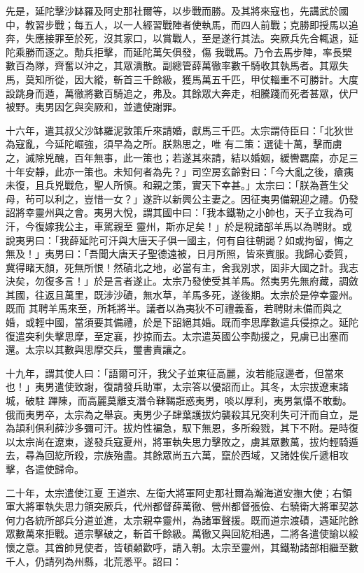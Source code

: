 \begin{pinyinscope}
 先是，延陀擊沙缽羅及阿史那社爾等，以步戰而勝。及其將來寇也，先講武於國中，教習步戰；每五人，以一人經習戰陣者使執馬，而四人前戰；克勝即授馬以追奔，失應接罪至於死，沒其家口，以賞戰人，至是遂行其法。突厥兵先合輒退，延陀乘勝而逐之。勣兵拒擊，而延陀萬矢俱發，傷
 我戰馬。乃令去馬步陣，率長槊數百為隊，齊奮以沖之，其眾潰散。副總管薛萬徹率數千騎收其執馬者。其眾失馬，莫知所從，因大縱，斬首三千餘級，獲馬萬五千匹，甲仗輜重不可勝計。大度設跳身而遁，萬徹將數百騎追之，弗及。其餘眾大奔走，相騰踐而死者甚眾，伏尸被野。夷男因乞與突厥和，並遣使謝罪。



 十六年，遣其叔父沙缽羅泥敦策斤來請婚，獻馬三千匹。太宗謂侍臣曰：「北狄世為寇亂，今延陀崛強，須早為之所。朕熟思之，唯
 有二策：選徒十萬，擊而虜之，滅除兇醜，百年無事，此一策也；若遂其來請，結以婚姻，緩轡羈縻，亦足三十年安靜，此亦一策也。未知何者為先？」司空房玄齡對曰：「今大亂之後，瘡痍未復，且兵兇戰危，聖人所慎。和親之策，實天下幸甚。」太宗曰：「朕為蒼生父母，茍可以利之，豈惜一女？」遂許以新興公主妻之。因征夷男備親迎之禮。仍發詔將幸靈州與之會。夷男大悅，謂其國中曰：「我本鐵勒之小帥也，天子立我為可汗，今復嫁我公主，車駕親至
 靈州，斯亦足矣！」於是稅諸部羊馬以為聘財。或說夷男曰：「我薛延陀可汗與大唐天子俱一國主，何有自往朝謁？如或拘留，悔之無及！」夷男曰：「吾聞大唐天子聖德遠被，日月所照，皆來賓服。我歸心委質，冀得睹天顏，死無所恨！然磧北之地，必當有主，舍我別求，固非大國之計。我志決矣，勿復多言！」於是言者遂止。太宗乃發使受其羊馬。然夷男先無府藏，調斂其國，往返且萬里，既涉沙磧，無水草，羊馬多死，遂後期。太宗於是停幸靈州。既而
 其聘羊馬來至，所耗將半。議者以為夷狄不可禮義畜，若聘財未備而與之婚，或輕中國，當須要其備禮，於是下詔絕其婚。既而李思摩數遣兵侵掠之。延陀復遣突利失擊思摩，至定襄，抄掠而去。太宗遣英國公李勣援之，見虜已出塞而還。太宗以其數與思摩交兵，璽書責讓之。



 十九年，謂其使人曰：「語爾可汗，我父子並東征高麗，汝若能寇邊者，但當來也！」夷男遣使致謝，復請發兵助軍，太宗答以優詔而止。其冬，太宗拔遼東諸城，破駐
 蹕陳，而高麗莫離支潛令靺鞨誑惑夷男，啖以厚利，夷男氣懾不敢動。俄而夷男卒，太宗為之舉哀。夷男少子肆葉護拔灼襲殺其兄突利失可汗而自立，是為頡利俱利薛沙多彌可汗。拔灼性褊急，馭下無恩，多所殺戮，其下不附。是時復以太宗尚在遼東，遂發兵寇夏州，將軍執失思力擊敗之，虜其眾數萬，拔灼輕騎遁去，尋為回紇所殺，宗族殆盡。其餘眾尚五六萬，竄於西域，又諸姓俟斤遞相攻擊，各遣使歸命。



 二十年，太宗遣使江夏
 王道宗、左衛大將軍阿史那社爾為瀚海道安撫大使；右領軍大將軍執失思力領突厥兵，代州都督薛萬徹、營州都督張儉、右驍衛大將軍契苾何力各統所部兵分道並進，太宗親幸靈州，為諸軍聲援。既而道宗渡磧，遇延陀餘眾數萬來拒戰。道宗擊破之，斬首千餘級。萬徹又與回紇相遇，二將各遣使諭以綏懷之意。其酋帥見使者，皆頓顙歡呼，請入朝。太宗至靈州，其鐵勒諸部相繼至數千人，仍請列為州縣，北荒悉平。詔曰：




\end{pinyinscope}
